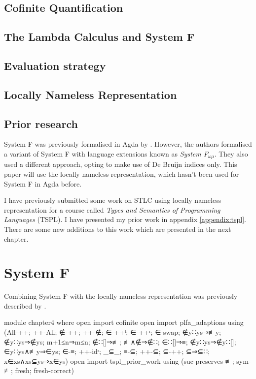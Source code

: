 \documentclass[logo,bsc,singlespacing,parskip,online]{infthesis}
\begin{document}
\section{Cofinite Quantification}



\section{The Lambda Calculus and System F}


\section{Evaluation strategy}
\label{background:evaluation_strategy}


\section{Locally Nameless Representation}


\section{Prior research}
System F was previously formalised in Agda by \citet{hutton_system_2019}. However, the authors
formalised a variant of System F with language extensions known as \textit{System F$_{\omega \mu}$}.
They also used a different approach, opting to make use of De Bruijn indices only. This paper will
use the locally nameless representation, which hasn't been used for System F in Agda before.

I have previously submitted some work on STLC using locally nameless representation for a course
called \textit{Types and Semantics of Programming Languages} (TSPL). I have presented my prior work
in appendix \ref{appendix:tspl}. There are some new additions to this work which are presented in
the next chapter.

\chapter{System F}
Combining System F with the locally nameless representation was previously described by
\citet{chargueraud_locally_2012}.
\begin{code}
module chapter4 where
  open import cofinite
  open import plfa_adaptions using (All-++; ++-All; ∉-++;
    ++-∉; ∈-++ˡ; ∈-++ʳ; ∈-swap; ∉y∷ys⇒≢y; ∉y∷ys⇒∉ys;
    m+1≤n⇒m≤n; ∉∷[]⇒≢; ≢∧∉⇒∉∷; ∈∷[]⇒≡; ∉y∷ys⇒∉y∷[];
    ∈y∷ys∧≢y⇒∈ys; ∈-≡; ++-idʳ; _⊆_; ≡-⊆; ++-⊆; ⊆-++; ⊆⇒⊆∷;
    x∈xs∧xs⊆ys⇒x∈ys)
  open import tspl_prior_work
    using (suc-preserves-≢; sym-≢; fresh; fresh-correct)
\end{code}
\end{document}
